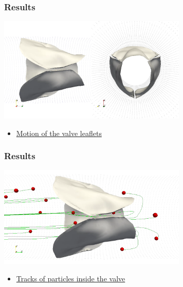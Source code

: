 \documentclass[14pt]{beamer}
\begin{document}
\begin{frame}
\frametitle{Results}
    \begin{center}
        \includegraphics[width=9cm]{valve_delaunay3_2.png}
    \end{center}

\begin{itemize}
    \item[\MVRightarrow] \href{run:video/valve_delaunay3.avi}{Motion of the valve leaflets}
\end{itemize}
\end{frame}

\begin{frame}
\frametitle{Results}
    \begin{center}
        \includegraphics[width=9cm]{valve_markers3.png}
    \end{center}

\begin{itemize}
    \item[\MVRightarrow] \href{run:video/valve_markers_better.avi}{Tracks of particles inside the valve}
\end{itemize}
\end{frame}


\end{document}
